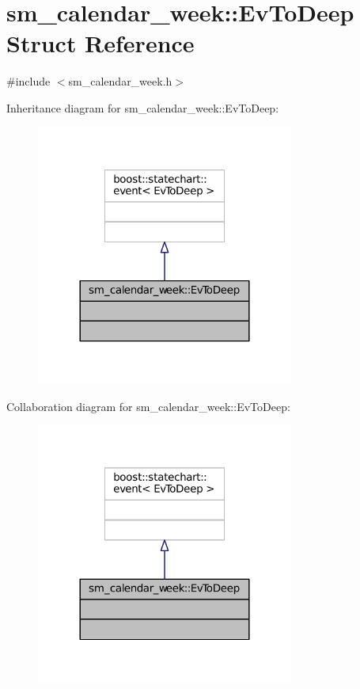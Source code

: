 \hypertarget{structsm__calendar__week_1_1EvToDeep}{}\section{sm\+\_\+calendar\+\_\+week\+:\+:Ev\+To\+Deep Struct Reference}
\label{structsm__calendar__week_1_1EvToDeep}


{\ttfamily \#include $<$sm\+\_\+calendar\+\_\+week.\+h$>$}



Inheritance diagram for sm\+\_\+calendar\+\_\+week\+:\+:Ev\+To\+Deep\+:
\nopagebreak
\begin{figure}[H]
\begin{center}
\leavevmode
\includegraphics[width=240pt]{structsm__calendar__week_1_1EvToDeep__inherit__graph}
\end{center}
\end{figure}


Collaboration diagram for sm\+\_\+calendar\+\_\+week\+:\+:Ev\+To\+Deep\+:
\nopagebreak
\begin{figure}[H]
\begin{center}
\leavevmode
\includegraphics[width=240pt]{structsm__calendar__week_1_1EvToDeep__coll__graph}
\end{center}
\end{figure}


